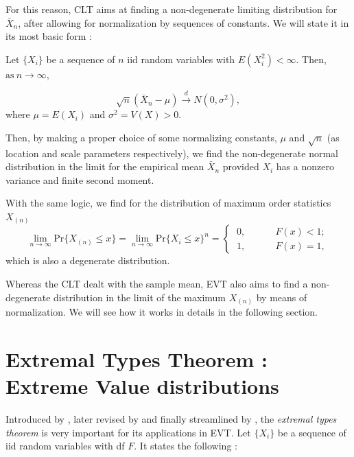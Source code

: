 For this reason, CLT aims at finding a non-degenerate limiting distribution for $\bar{X}_n$, after allowing for normalization by sequences of constants. We will state it in its most basic form :

\begin{exe} 
	Let $\{X_i\}$ be a sequence of $n$ iid random variables with $E(X^2_i)<\infty$. Then, $\text{as} \ n\rightarrow\infty$,
	
	\begin{equation*}
	\sqrt{n}(\bar{X}_n-\mu)\stackrel{d}{\longrightarrow}N(0,\sigma^2),
	\end{equation*}
	where $\mu=E(X_i)$ and $\sigma^2=V(X)>0$.
\end{exe}

Then, by making a proper choice of some normalizing constants, $\mu$ and $\sqrt{n}$ (as location and scale parameters respectively), we find the non-degenerate normal distribution in the limit for the empirical mean $\bar{X}_n$ provided $X_i$ has a nonzero variance and finite second moment. 

With the same logic, we find for the distribution of maximum order statistics $X_{(n)}$ 
\begin{equation}
\displaystyle{\lim_{n \to \infty}}\text{Pr}\big\{X_{(n)}\leq x\big\}=\displaystyle{\lim_{n \to \infty}}\text{Pr}\big\{X_i\leq x\big\}^n=\begin{cases}
\ 0, \ \ \ \ \ \ \ \ \ \ \  \ \ \ F(x)<1; \\ 
\ 1, \ \ \ \ \ \ \ \ \ \ \ \  \ \ F(x)=1,
\end{cases}
\end{equation}
which is also a degenerate distribution.

Whereas the CLT dealt with the sample mean, EVT also aims to find a non-degenerate distribution in the limit of the maximum $X_{(n)}$ by means of normalization. We will see how it works in details in the following section.


\section{Extremal Types Theorem : Extreme Value distributions}\label{sec:extrtypethm}


Introduced by \cite{fisher_limiting_1928}, later revised by \cite{gnedenko_sur_1943} and finally streamlined by \cite{de_haan_regular_1970}, the \emph{extremal types theorem} is very important for its applications in EVT. Let $\{X_i\}$ be a sequence of iid random variables with df $F$. It states the following :  

